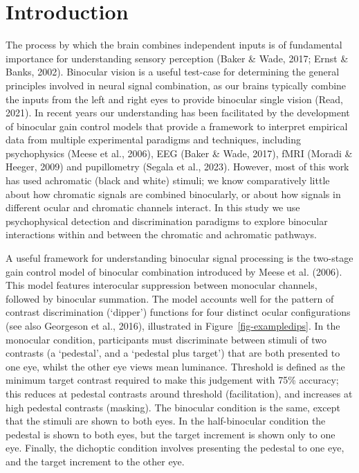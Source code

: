 \documentclass[
  letterpaper,
  DIV=11,
  numbers=noendperiod]{scrartcl}
\begin{document}
\section{Introduction}\label{introduction}

The process by which the brain combines independent inputs is of
fundamental importance for understanding sensory perception (Baker \&
Wade, 2017; Ernst \& Banks, 2002). Binocular vision is a useful
test-case for determining the general principles involved in neural
signal combination, as our brains typically combine the inputs from the
left and right eyes to provide binocular single vision (Read, 2021). In
recent years our understanding has been facilitated by the development
of binocular gain control models that provide a framework to interpret
empirical data from multiple experimental paradigms and techniques,
including psychophysics (Meese et al., 2006), EEG (Baker \& Wade, 2017),
fMRI (Moradi \& Heeger, 2009) and pupillometry (Segala et al., 2023).
However, most of this work has used achromatic (black and white)
stimuli; we know comparatively little about how chromatic signals are
combined binocularly, or about how signals in different ocular and
chromatic channels interact. In this study we use psychophysical
detection and discrimination paradigms to explore binocular interactions
within and between the chromatic and achromatic pathways.

A useful framework for understanding binocular signal processing is the
two-stage gain control model of binocular combination introduced by
Meese et al. (2006). This model features interocular suppression between
monocular channels, followed by binocular summation. The model accounts
well for the pattern of contrast discrimination (`dipper') functions for
four distinct ocular configurations (see also Georgeson et al., 2016),
illustrated in Figure~\ref{fig-exampledips}. In the monocular condition,
participants must discriminate between stimuli of two contrasts (a
`pedestal', and a `pedestal plus target') that are both presented to one
eye, whilst the other eye views mean luminance. Threshold is defined as
the minimum target contrast required to make this judgement with 75\%
accuracy; this reduces at pedestal contrasts around threshold
(facilitation), and increases at high pedestal contrasts (masking). The
binocular condition is the same, except that the stimuli are shown to
both eyes. In the half-binocular condition the pedestal is shown to both
eyes, but the target increment is shown only to one eye. Finally, the
dichoptic condition involves presenting the pedestal to one eye, and the
target increment to the other eye.
\end{document}
